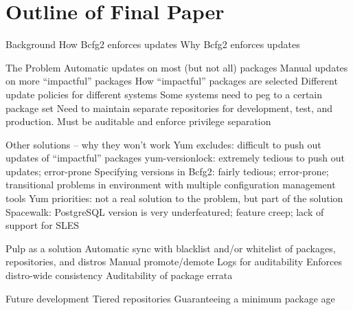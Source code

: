 \section{Outline of Final Paper}
\label{sec:outline}

\begin{outline}[enumerate]
\1 Background
\2 How Bcfg2 enforces updates
\3 Why Bcfg2 enforces updates

\1 The Problem
\2 Automatic updates on most (but not all) packages
\2 Manual updates on more ``impactful'' packages
\3 How ``impactful'' packages are selected
\2 Different update policies for different systems
\3 Some systems need to peg to a certain package set
\2 Need to maintain separate repositories for development, test, and
production.
\2 Must be auditable and enforce privilege separation

\1 Other solutions -- why they won't work
\2 Yum excludes: difficult to push out updates of ``impactful'' packages
\2 yum-versionlock: extremely tedious to push out updates; error-prone
\2 Specifying versions in Bcfg2: fairly tedious; error-prone;
transitional problems in environment with multiple configuration
management tools
\2 Yum priorities: not a real solution to the problem, but part of the
solution
\2 Spacewalk: PostgreSQL version is very underfeatured; feature creep; lack
of support for SLES

\1 Pulp as a solution
\2 Automatic sync with blacklist and/or whitelist of packages,
repositories, and distros
\2 Manual promote/demote
\2 Logs for auditability
\2 Enforces distro-wide consistency
\2 Auditability of package errata

\1 Future development
\2 Tiered repositories
\2 Guaranteeing a minimum package age
\end{outline}
